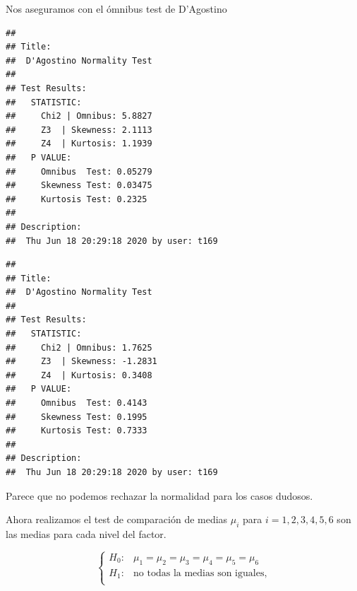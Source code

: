 \documentclass[
]{article}
\newenvironment{Shaded}{\begin{snugshade}}{\end{snugshade}}
\newcommand{\KeywordTok}[1]{\textcolor[rgb]{0.13,0.29,0.53}{\textbf{#1}}}
\newcommand{\NormalTok}[1]{#1}
\newcommand{\OperatorTok}[1]{\textcolor[rgb]{0.81,0.36,0.00}{\textbf{#1}}}
\newcommand{\StringTok}[1]{\textcolor[rgb]{0.31,0.60,0.02}{#1}}
\begin{document}
Nos aseguramos con el ómnibus test de D'Agostino

\begin{Shaded}
\end{Shaded}

\begin{verbatim}
## 
## Title:
##  D'Agostino Normality Test
## 
## Test Results:
##   STATISTIC:
##     Chi2 | Omnibus: 5.8827
##     Z3  | Skewness: 2.1113
##     Z4  | Kurtosis: 1.1939
##   P VALUE:
##     Omnibus  Test: 0.05279 
##     Skewness Test: 0.03475 
##     Kurtosis Test: 0.2325 
## 
## Description:
##  Thu Jun 18 20:29:18 2020 by user: t169
\end{verbatim}

\begin{Shaded}
\end{Shaded}

\begin{verbatim}
## 
## Title:
##  D'Agostino Normality Test
## 
## Test Results:
##   STATISTIC:
##     Chi2 | Omnibus: 1.7625
##     Z3  | Skewness: -1.2831
##     Z4  | Kurtosis: 0.3408
##   P VALUE:
##     Omnibus  Test: 0.4143 
##     Skewness Test: 0.1995 
##     Kurtosis Test: 0.7333 
## 
## Description:
##  Thu Jun 18 20:29:18 2020 by user: t169
\end{verbatim}

Parece que no podemos rechazar la normalidad para los casos dudosos.

Ahora realizamos el test de comparación de medias \(\mu_i\) para
\(i=1,2,3,4,5,6\) son las medias para cada nivel del factor.

\[
\left\{
\begin{array}{ll}
H_0: & \mu_1=\mu_2=\mu_3=\mu_4=\mu_5=\mu_6\\
H_1: & \mbox{no todas la medias son iguales,}\\
\end{array}
\right.
\]

\begin{Shaded}
\end{Shaded}
\end{document}
